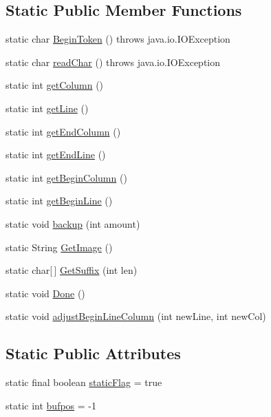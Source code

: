 \subsection*{Static Public Member Functions}
\begin{DoxyCompactItemize}
\item 
static char \hyperlink{classpack_1_1_simple_char_stream_a328c41e11accdc7f1a036c2214a55cc5}{Begin\+Token} ()  throws java.\+io.\+I\+O\+Exception   
\item 
static char \hyperlink{classpack_1_1_simple_char_stream_a7c273776741ab2be486c3271fdfdd6f0}{read\+Char} ()  throws java.\+io.\+I\+O\+Exception   
\item 
static int \hyperlink{classpack_1_1_simple_char_stream_a7ec8943f58d0ac8363996236d8d3bd6c}{get\+Column} ()
\item 
static int \hyperlink{classpack_1_1_simple_char_stream_a53f10757a413517ff89d6d9d6dc0b2bc}{get\+Line} ()
\item 
static int \hyperlink{classpack_1_1_simple_char_stream_a93d304218932ae9db2c8a450836f11dd}{get\+End\+Column} ()
\item 
static int \hyperlink{classpack_1_1_simple_char_stream_a76d5676fd8c62e7851d4a2bc7c52394d}{get\+End\+Line} ()
\item 
static int \hyperlink{classpack_1_1_simple_char_stream_af21db733ee0ae1d010960d81fe5575fc}{get\+Begin\+Column} ()
\item 
static int \hyperlink{classpack_1_1_simple_char_stream_a41efa009f0fb7bd8831cacaa7dd24bab}{get\+Begin\+Line} ()
\item 
static void \hyperlink{classpack_1_1_simple_char_stream_a8b2a584603bc91c13f63808d9bbc433d}{backup} (int amount)
\item 
static String \hyperlink{classpack_1_1_simple_char_stream_a86f2f0db13ca1792c188751da1f64fa7}{Get\+Image} ()
\item 
static char\mbox{[}$\,$\mbox{]} \hyperlink{classpack_1_1_simple_char_stream_ad95bea2a2db86fdce03257720d6cfab2}{Get\+Suffix} (int len)
\item 
static void \hyperlink{classpack_1_1_simple_char_stream_a2125f00ae839d043dd1a52bf68c25623}{Done} ()
\item 
static void \hyperlink{classpack_1_1_simple_char_stream_a8aac7999f6d4d963662b21b2599813ef}{adjust\+Begin\+Line\+Column} (int new\+Line, int new\+Col)
\end{DoxyCompactItemize}
\subsection*{Static Public Attributes}
\begin{DoxyCompactItemize}
\item 
static final boolean \hyperlink{classpack_1_1_simple_char_stream_a57e32aa1c2ba0aabf1c48108f5bd1cc8}{static\+Flag} = true
\item 
static int \hyperlink{classpack_1_1_simple_char_stream_a5fee3a4d5f641687f0236f9471cdf337}{bufpos} = -\/1
\end{DoxyCompactItemize}

